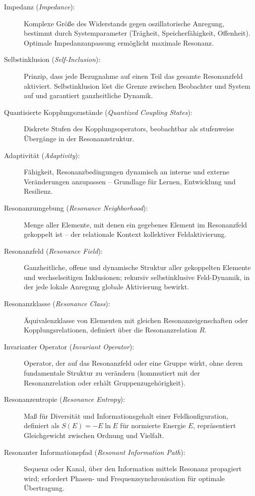 \documentclass[12pt]{iopart}
\begin{document}
\begin{description}
	\item[Impedanz (\textit{Impedance}):]  
	Komplexe Größe des Widerstands gegen oszillatorische Anregung, bestimmt durch Systemparameter (Trägheit, Speicherfähigkeit, Offenheit). Optimale Impedanzanpassung ermöglicht maximale Resonanz.
	
	\item[Selbstinklusion (\textit{Self-Inclusion}):]  
	Prinzip, dass jede Bezugnahme auf einen Teil das gesamte Resonanzfeld aktiviert. Selbstinklusion löst die Grenze zwischen Beobachter und System auf und garantiert ganzheitliche Dynamik.
	
	\item[Quantisierte Kopplungszustände (\textit{Quantized Coupling States}):]  
	Diskrete Stufen des Kopplungsoperators, beobachtbar als stufenweise Übergänge in der Resonanzstruktur.
	
	\item[Adaptivität (\textit{Adaptivity}):]  
	Fähigkeit, Resonanzbedingungen dynamisch an interne und externe Veränderungen anzupassen – Grundlage für Lernen, Entwicklung und Resilienz.
	
	\item[Resonanzumgebung (\textit{Resonance Neighborhood}):]  
	Menge aller Elemente, mit denen ein gegebenes Element im Resonanzfeld gekoppelt ist – der relationale Kontext kollektiver Feldaktivierung.
	
	\item[Resonanzfeld (\textit{Resonance Field}):]  
	Ganzheitliche, offene und dynamische Struktur aller gekoppelten Elemente und wechselseitigen Inklusionen; rekursiv selbstinklusive Feld-Dynamik, in der jede lokale Anregung globale Aktivierung bewirkt.
	
	\item[Resonanzklasse (\textit{Resonance Class}):]  
	Äquivalenzklasse von Elementen mit gleichen Resonanzeigenschaften oder Kopplungsrelationen, definiert über die Resonanzrelation $R$.
	
	\item[Invarianter Operator (\textit{Invariant Operator}):]  
	Operator, der auf das Resonanzfeld oder eine Gruppe wirkt, ohne deren fundamentale Struktur zu verändern (kommutiert mit der Resonanzrelation oder erhält Gruppenzugehörigkeit).
	
	\item[Resonanzentropie (\textit{Resonance Entropy}):]  
	Maß für Diversität und Informationsgehalt einer Feldkonfiguration, definiert als $S(E) = -E \ln E$ für normierte Energie $E$, repräsentiert Gleichgewicht zwischen Ordnung und Vielfalt.
	
	\item[Resonanter Informationspfad (\textit{Resonant Information Path}):]  
	Sequenz oder Kanal, über den Information mittels Resonanz propagiert wird; erfordert Phasen- und Frequenzsynchronisation für optimale Übertragung.
	
\end{description}
\end{document}
